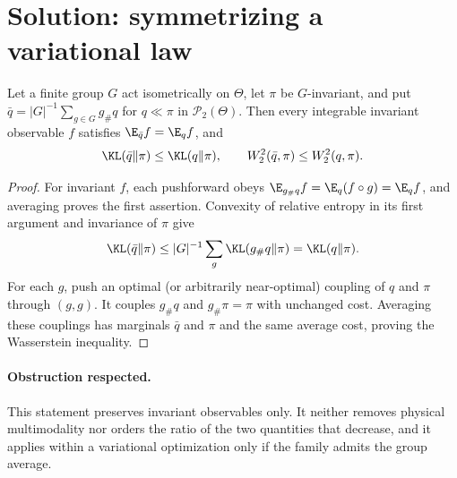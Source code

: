 \documentclass[../main.tex]{subfiles}
\begin{document}

\section*{Solution: symmetrizing a variational law}

\begin{lemma}
Let a finite group $G$ act isometrically on $\Theta$, let $\pi$ be $G$-invariant, and put
$\bar q=|G|^{-1}\sum_{g\in G}g_\#q$ for $q\ll\pi$ in $\mathcal P_2(\Theta)$. Then every
integrable invariant observable $f$ satisfies $\E_{\bar q}f=\E_qf$, and
\[
 \KL(\bar q\|\pi)\le\KL(q\|\pi),\qquad
 W_2^2(\bar q,\pi)\le W_2^2(q,\pi).
\]
\end{lemma}

\begin{proof}
For invariant $f$, each pushforward obeys $\E_{g_\#q}f=\E_q(f\circ g)=\E_qf$, and averaging
proves the first assertion. Convexity of relative entropy in its first argument and invariance of
$\pi$ give
\[
 \KL(\bar q\|\pi)
 \le |G|^{-1}\sum_g\KL(g_\#q\|\pi)=\KL(q\|\pi).
\]
For each $g$, push an optimal (or arbitrarily near-optimal) coupling of $q$ and $\pi$ through
$(g,g)$. It couples $g_\#q$ and $g_\#\pi=\pi$ with unchanged cost. Averaging these couplings
has marginals $\bar q$ and $\pi$ and the same average cost, proving the Wasserstein inequality.
\end{proof}

\paragraph{Obstruction respected.}
This statement preserves invariant observables only. It neither removes physical multimodality
nor orders the ratio of the two quantities that decrease, and it applies within a variational
optimization only if the family admits the group average.
\end{document}
